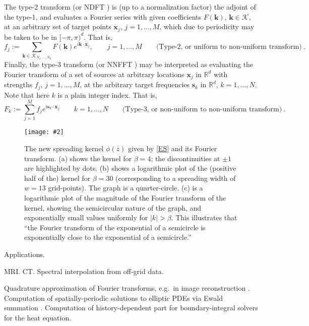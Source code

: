 \documentclass[10pt]{article}
\newcommand{\be}{\begin{equation}}
\newcommand{\ee}{\end{equation}}
\newcommand{\bfi}{\begin{figure}}
\newcommand{\efi}{\end{figure}}
\newcommand{\ca}[2]{\caption{#1 \label{#2}}}
\newcommand{\ig}[2]{\texttt{[image: \#2]}}
\newcommand{\mbf}[1]{{\mathbf #1}}
\newcommand{\RR}{\mathbb{R}}
\newcommand{\xx}{\mbf{x}}
\newcommand{\sss}{\mbf{s}}
\newcommand{\kk}{\mbf{k}}
\newcommand{\KK}{{\mathcal K}}
\newcommand{\NU}{{non-uniform}}
\newcommand{\U}{{uniform}}
\begin{document}
The type-2 transform (or NDFT \cite{usingnfft})
is (up to a normalization factor) the adjoint of the
type-1, and evaluates a Fourier series with given coefficients
$F(\kk)$, $\kk\in\KK$, at an arbitrary set of target points
$\xx_j$, $j=1,\ldots,M$, which due to periodicity may be taken to be in $[-\pi,\pi)^d$.
  That is,
  \be
  f_j := \sum_{\kk\in\KK_{N_1,\dots,N_d}} F(\kk) e^{i \kk\cdot \xx_j},
  \qquad j=1,\dots, M
\qquad \mbox{(Type-2, or \U\ to \NU\ transform)}
~.
\label{2}
\ee
Finally, the type-3 transform
\cite{nufft3} (or NNFFT \cite{usingnfft})
may be interpreted as evaluating the
Fourier transform of a set of sources at arbitrary locations $\xx_j$
in $\RR^d$
with strengths $f_j$, $j=1,\dots, M$, at the arbitrary target frequencies
$\sss_k$ in $\RR^d$, $k=1,\dots, N$. Note that here $k$ is a plain integer
index.
That is,
\be
F_k := \sum_{j=1}^M f_j e^{i \sss_k \cdot \xx_j}
  \qquad k=1,\dots, N
\qquad \mbox{(Type-3, or \NU\ to \NU\ transform)}
~.
\label{3}
\ee




\bfi[t]  %
\ig{width=6.5in}{kernel.eps}
\ca{The new spreading kernel $\phi(z)$ given by
  \eqref{ES} and its Fourier transform.
  (a) shows the kernel for $\beta=4$; the discontinuities at
  $\pm 1$ are highlighted by dots.
  (b) shows a logarithmic plot of the (positive half of the)
  kernel for $\beta=30$
  (corresponding to a spreading width of $w=13$ grid-points).
  The graph is a quarter-circle.
  (c) is a logarithmic plot of the magnitude of the
  Fourier transform of the kernel,
  showing the semicircular nature of the graph, and exponentially
  small values uniformly for $|k|>\beta$.
  This illustrates that ``the Fourier transform of the exponential
  of a semicircle is exponentially close to the exponential of a semicircle.''
}{f:kernel}
\efi
  








Applications.

MRI.
CT.
Spectral interpolation from off-grid data.

Quadrature approximation of Fourier transforms, e.g.\
in image reconstruction \cite{cryo}.
Computation of spatially-periodic solutions to elliptic
PDEs via Ewald summation
\cite{lindbo11}.
Computation of history-dependent part for boundary-integral solvers
for the heat equation.%
\end{document}

